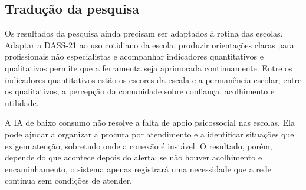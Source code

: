 \subsection{Tradução da pesquisa}

Os resultados da pesquisa ainda precisam ser adaptados à rotina das escolas.
Adaptar a DASS-21 ao uso cotidiano da escola, produzir orientações claras para
profissionais não especialistas e acompanhar indicadores quantitativos e
qualitativos permite que a ferramenta seja aprimorada continuamente. Entre os
indicadores quantitativos estão os escores da escala e a permanência escolar;
entre os qualitativos, a percepção da comunidade sobre confiança, acolhimento e
utilidade.

A IA de baixo consumo não resolve a falta de apoio psicossocial nas escolas.
Ela pode ajudar a organizar a procura por atendimento e a identificar situações
que exigem atenção, sobretudo onde a conexão é instável. O resultado, porém,
depende do que acontece depois do alerta: se não houver acolhimento e
encaminhamento, o sistema apenas registrará uma necessidade que a rede continua
sem condições de atender.
